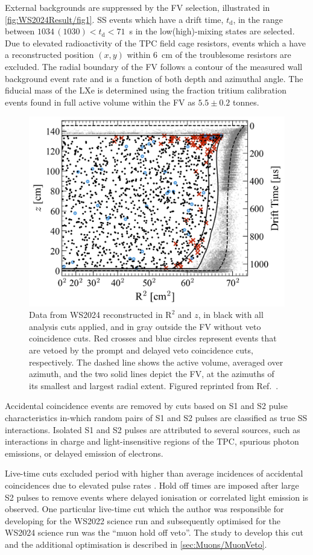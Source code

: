 External backgrounds are suppressed by the FV selection, illustrated in \autoref{fig:WS2024Result/fig1}. SS events which have a drift time, $t_\text{d}$, in the range between $1034\,(1030)<t_\text{d}<71$~\textmu s in the low(high)-mixing states are selected. Due to elevated radioactivity of the TPC field cage resistors, events which a have a reconstructed position $(x,y)$ within 6~cm of the troublesome resistors are excluded. The radial boundary of the FV follows a contour of the measured wall background event rate and is a function of both depth and azimuthal angle. The fiducial mass of the LXe is determined using the fraction tritium calibration events found in full active volume within the FV as $5.5\pm0.2$ tonnes.
\begin{figure}[t!]
    \centering
    \includegraphics[width=0.7\linewidth]{figures/WS2024Result/figure1.png}
    \caption{Data from WS2024 reconstructed in $\text{R}^2$ and $z$, in black with all analysis cuts applied, and in gray outside the FV without veto coincidence cuts. Red crosses and blue circles represent events that are vetoed by the prompt and delayed veto coincidence cuts, respectively. The dashed line shows the active volume, averaged over azimuth, and the two solid lines depict the FV, at the azimuths of its smallest and largest radial extent. Figured reprinted from Ref.~\cite{LZCollaboration:2024lux}.}
    \label{fig:WS2024Result/fig1}
\end{figure}
Accidental coincidence events are removed by cuts based on S1 and S2 pulse characteristics in-which random pairs of S1 and S2 pulses are classified as true SS interactions. Isolated S1 and S2 pulses are attributed to several sources, such as interactions in charge and light-insensitive regions of the TPC, spurious photon emissions, or delayed emission of electrons.

Live-time cuts excluded period with higher than average incidences of accidental coincidences due to elevated pulse rates \cite{LZCollaboration:2024lux}. Hold off times are imposed after large S2 pulses to remove events where delayed ionisation or correlated light emission is observed. One particular live-time cut which the author was responsible for developing for the WS2022 science run \cite{LZ:2022lsv} and subsequently optimised for the WS2024 science run was the ``muon hold off veto''. The study to develop this cut and the additional optimisation is described in \autoref{sec:Muons/MuonVeto}.

